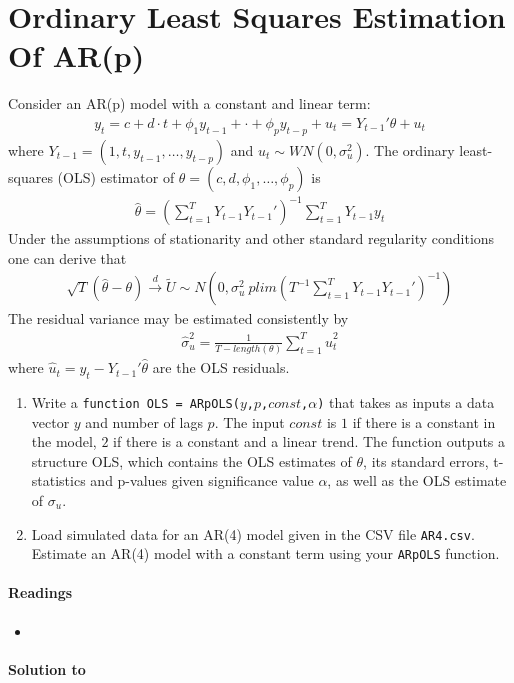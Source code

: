 \section[Ordinary Least Squares Estimation Of AR(p)]{Ordinary Least Squares Estimation Of AR(p)\label{ex:OrdinaryLeastSquaresEstimationARp}}
Consider an AR(p) model with a constant and linear term:
\begin{align*}
y_t = c + d\cdot t + \phi_1 y_{t-1} +\cdot + \phi_p y_{t-p} +u_{t}=Y_{t-1}'\theta + u_t
\end{align*}
  where \(Y_{t-1}=(1,t,y_{t-1},\ldots,y_{t-p})\) and \(u_t\sim WN(0,\sigma_u^2)\).
The ordinary least-squares (OLS) estimator of \(\theta = (c,d,\phi_1,\ldots,\phi_p)\) is
\begin{align*}
\hat{\theta} = {\left(\sum_{t=1}^T Y_{t-1}Y_{t-1}'\right)}^{-1}\sum_{t=1}^T Y_{t-1} y_t    
\end{align*}
Under the assumptions of stationarity and other standard regularity conditions one can derive that
\begin{align*}
\sqrt{T}(\hat{\theta}-\theta)\overset{d}{\rightarrow}\tilde{U}\sim N\left(0,\sigma_u^2~{plim}\left(T^{-1}\sum_{t=1}^T Y_{t-1}Y_{t-1}'\right)^{-1} \right)
\end{align*}
The residual variance may be estimated consistently by
\begin{align*}
\hat{\sigma}_u^2 = \frac{1}{T-length(\theta)}\sum_{t=1}^T\hat{u}_t^2
\end{align*}
where \(\hat{u}_t=y_t -Y_{t-1}'\hat{\theta}\) are the OLS residuals.

\begin{enumerate}
\item Write a \texttt{function OLS = ARpOLS(\(y\),\(p\),\(const\),\(\alpha\))}
  that takes as inputs a data vector $y$ and number of lags $p$.
The input \(const\) is \(1\) if there is a constant in the model,
  \(2\) if there is a constant and a linear trend.
The function outputs a structure OLS,
  which contains the OLS estimates of \(\theta\),
  its standard errors, t-statistics and p-values given significance value \(\alpha\),
  as well as the OLS estimate of \(\sigma_u\).
\item Load simulated data for an AR(4) model given in the CSV file \texttt{AR4.csv}.
Estimate an AR(4) model with a constant term using your \texttt{ARpOLS} function.
\end{enumerate}

\paragraph{Readings}
\begin{itemize}
	\item \textcite{Lutkepohl_2004_UnivariateTimeSeries}
\end{itemize}


\begin{solution}\textbf{Solution to }
\ifDisplaySolutions

\fi
\newpage
\end{solution}